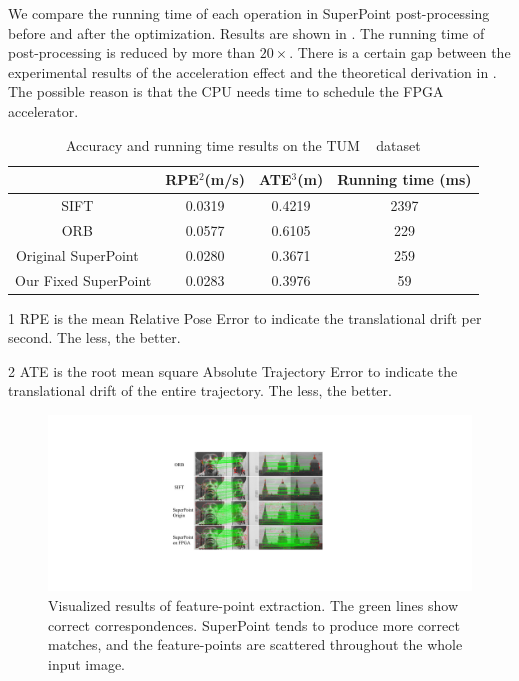 We compare the running time of each operation in SuperPoint post-processing before and after the optimization. Results are shown in . The running time of post-processing is reduced by more than $20\times$. There is a certain gap between the experimental results of the acceleration effect and the theoretical derivation in . The possible reason is that the CPU needs time to schedule the FPGA accelerator.

\begin{table}[t]
  \centering
  \caption{ Accuracy and running time results on the TUM ~\cite{sturm12iros} dataset  }
  \footnotesize
  \begin{threeparttable}
\begin{tabular}{|c|c|c|c|} 
  \hline
        & RPE$^2$(m/s) & ATE$^3$(m)  & Running time (ms) \bigstrut\\
  \hline
  SIFT  ~\cite{Lowe-478}  & 0.0319  & 0.4219 & 2397  \bigstrut\\
  \hline
  ORB  ~\cite{Mur-Artal:2017281}  & 0.0577  & 0.6105 & 229  \bigstrut\\
  \hline
  Original SuperPoint  ~\cite{detone2018superpoint} & 0.0280  & 0.3671 & 259  \bigstrut\\
  \hline
  Our Fixed SuperPoint  & 0.0283  & 0.3976 & 59  \bigstrut\\
  \hline
  \end{tabular}%
  

\begin{tablenotes}
  \scriptsize
  \item[1] RPE is the mean Relative Pose Error to indicate the translational drift per second. The less, the better.
  \item[2] ATE is the root mean square Absolute Trajectory Error to indicate the translational drift of the entire trajectory. The less, the better.
\end{tablenotes}
    \end{threeparttable}
  \label{tab:VO}%
\end{table}%


\begin{figure}[t]
  \centering  
  \includegraphics[width=0.99\linewidth]{fig/visual.pdf}
  \vspace{-5mm}
  \caption{Visualized results of feature-point extraction. The green lines show correct correspondences. SuperPoint tends to produce more correct matches, and the feature-points are scattered throughout the whole input image. }
  \label{fig:dputorch}
\end{figure}


